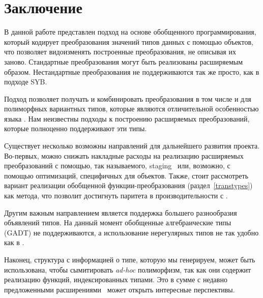 \section{Заключение}
\label{sec:futurework}

В данной работе представлен подход на основе обобщенного программирования, который кодирует преобразования значений типов данных с помощью объектов, что позволяет видоизменять построенные преобразования, не описывая их заново. Стандартные преобразования могут быть реализованы расширяемым образом. 
Нестандартные преобразования не поддерживаются так же просто, как в подходе SYB. 

Подход позволяет получать и комбинировать преобразования в том числе и для полиморфных вариантных типов, которые являются отличительной особенностью языка \OCaml{}. Нам неизвестны подходы к построению расширяемых преобразований, которые полноценно поддерживают эти типы. 

Существует несколько возможны направлений для дальнейшего развития проекта. Во-первых, можно снижать накладные расходы на реализацию расширяемых преобразований 
с помощью, так называемого, staging~\cite{Staged} или, возможно, с помощью оптимизаций, специфичных для объектов. 
Также, стоит рассмотреть вариант реализации обобщенной функции-преобразования (раздел~\ref{transtypes}) как метода, что позволит достигнуть паритета в производительности с \Visitors{}.

Другим важным направлением является поддержка большего разнообразия объявлений типов.
На данный момент обобщенные алгебраические типы (GADT) не поддерживаются, а использование нерегулярных типов
не так удобно как в \Visitors{}.

Наконец, структура с информацией о типе, которую мы генерируем, может быть использована, чтобы сымитировать \emph{ad-hoc} полиморфизм, так как они содержит реализацию функций, индексированных типами. Это в сумме с недавно предложенными расширениями~\cite{ModularImplicits} может открыть интересные перспективы.

